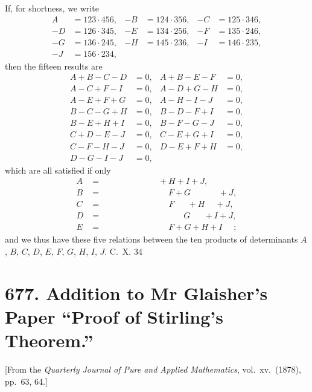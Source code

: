 \documentclass[11pt,a4paper]{book}
\begin{document}
If, for shortness, we write
\begin{align*}
A &= 123 \cdot 456, & -B &= 124 \cdot 356, & -C &= 125 \cdot 346, \\
-D &= 126 \cdot 345, & -E &= 134 \cdot 256, & -F &= 135 \cdot 246, \\
-G &= 136 \cdot 245, & -H &= 145 \cdot 236, & -I &= 146 \cdot 235, \\
-J &= 156 \cdot 234,
\end{align*}
then the fifteen results are
\begin{align*}
A + B - C - D &= 0, & A + B - E - F &= 0, \\
A - C + F - I &= 0, & A - D + G - H &= 0, \\
A - E + F + G &= 0, & A - H - I - J &= 0, \\
B - C - G + H &= 0, & B - D - F + I &= 0, \\
B - E + H + I &= 0, & B - F - G - J &= 0, \\
C + D - E - J &= 0, & C - E + G + I &= 0, \\
C - F - H - J &= 0, & D - E + F + H &= 0, \\
D - G - I - J &= 0,
\end{align*}
which are all satisfied if only
\begin{align*}
A &= \phantom{B + C + D + E} + H + I + J, \\
B &= \phantom{A + C + D + E +} F + G \phantom{+ H + I} + J, \\
C &= \phantom{A + B + D + E +} F \phantom{+ G} + H \phantom{+ I} + J, \\
D &= \phantom{A + B + C + E +} \phantom{F +} G \phantom{+ H} + I + J, \\
E &= \phantom{A + B + C + D +} F + G + H + I \phantom{+ J};
\end{align*}
and we thus have these five relations between the ten products of determinants $A$, $B$, $C$, $D$, $E$, $F$, $G$, $H$, $I$, $J$.
\hfill C.~X. 34

\newpage

\section*{677. Addition to Mr Glaisher's Paper ``Proof of Stirling's Theorem.''}

[From the \textit{Quarterly Journal of Pure and Applied Mathematics}, vol.\ xv.\ (1878), pp.\ 63, 64.]
\end{document}

